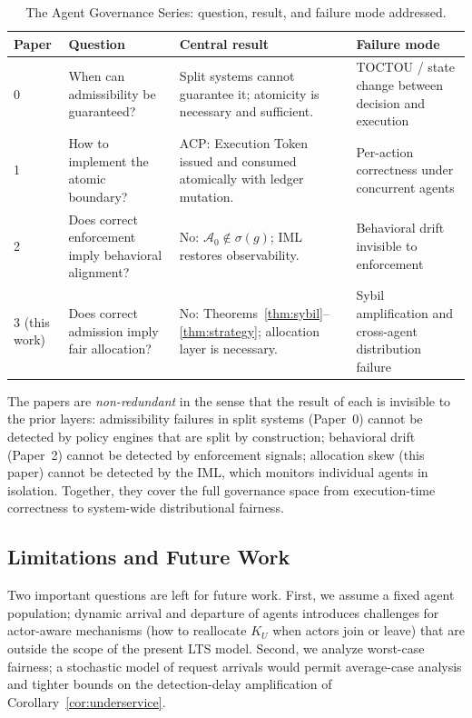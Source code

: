 \documentclass[11pt]{article}
\theoremstyle{plain}
\theoremstyle{definition}
\theoremstyle{remark}
\begin{document}
\begin{table}[h]
\centering
\caption{The Agent Governance Series: question, result, and failure mode addressed.}
\label{tab:quartet}
\small
\begin{tabular}{lp{3.2cm}p{3.6cm}p{3.0cm}}
\toprule
\textbf{Paper} & \textbf{Question} & \textbf{Central result} &
  \textbf{Failure mode} \\
\midrule
0 \citep{fernandez2026a}
  & When can admissibility be guaranteed?
  & Split systems cannot guarantee it; atomicity is necessary and sufficient.
  & TOCTOU / state change between decision and execution \\[4pt]
1 \citep{fernandez2026b}
  & How to implement the atomic boundary?
  & ACP: Execution Token issued and consumed atomically with ledger mutation.
  & Per-action correctness under concurrent agents \\[4pt]
2 \citep{fernandez2026c}
  & Does correct enforcement imply behavioral alignment?
  & No: $\mathcal{A}_0 \notin \sigma(g)$; IML restores observability.
  & Behavioral drift invisible to enforcement \\[4pt]
3 (this work)
  & Does correct admission imply fair allocation?
  & No: Theorems~\ref{thm:sybil}--\ref{thm:strategy}; allocation layer is necessary.
  & Sybil amplification and cross-agent distribution failure \\
\bottomrule
\end{tabular}
\end{table}

The papers are \emph{non-redundant} in the sense that the result of each
is invisible to the prior layers: admissibility failures in split systems
(Paper~0) cannot be detected by policy engines that are split by
construction; behavioral drift (Paper~2) cannot be detected by
enforcement signals; allocation skew (this paper) cannot be detected
by the IML, which monitors individual agents in isolation.  Together,
they cover the full governance space from execution-time correctness to
system-wide distributional fairness.

\subsection{Limitations and Future Work}
\label{sec:limitations}

Two important questions are left for future work.  First, we assume
a fixed agent population; dynamic arrival and departure of agents
introduces challenges for actor-aware mechanisms (how to reallocate
$K_U$ when actors join or leave) that are outside the scope of the
present LTS model.  Second, we analyze worst-case fairness; a
stochastic model of request arrivals would permit average-case
analysis and tighter bounds on the detection-delay amplification of
Corollary~\ref{cor:underservice}.
\end{document}
